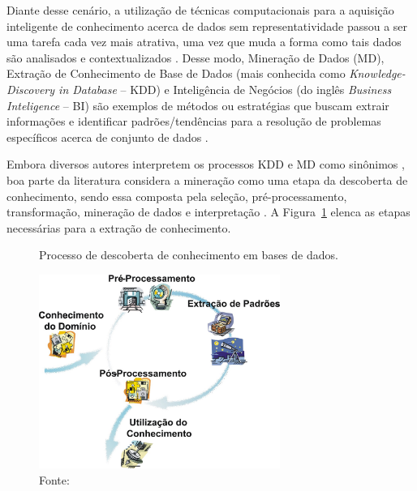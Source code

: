 Diante desse cenário, a utilização de técnicas computacionais para a aquisição inteligente de conhecimento acerca de dados sem representatividade passou a ser uma tarefa cada vez mais atrativa, uma vez que muda a forma como tais dados são analisados e contextualizados \cite{cap02_ref11}. Desse modo, Mineração de Dados (MD), Extração de Conhecimento de Base de Dados (mais conhecida como \textit{Knowledge-Discovery in Database} – KDD) e Inteligência de Negócios (do inglês \textit{Business Inteligence} – BI) são exemplos de métodos ou estratégias que buscam extrair informações e identificar padrões/tendências para a resolução de problemas específicos acerca de conjunto de dados \cite{cap02_ref12, cap02_ref4}. 

Embora diversos autores interpretem os processos KDD e MD como sinônimos \cite{cap02_ref11, cap02_ref6}, boa parte da literatura considera a mineração como uma etapa da descoberta de conhecimento, sendo essa composta pela seleção, pré-processamento, transformação, mineração de dados e interpretação \cite{cap02_ref12, cap02_ref5}. A Figura~\ref{fig:kdd_process} elenca as etapas necessárias para a extração de conhecimento.


\begin{figure}[htpb]
   \centering
   \caption{Processo de descoberta de conhecimento em bases de dados.}
   \includegraphics[width=0.7\textwidth]{figs/cap02_KDD_model.png}
   \caption*{\footnotesize{Fonte: \cite{cap02_ref11}}}
   \label{fig:kdd_process}
\end{figure}

